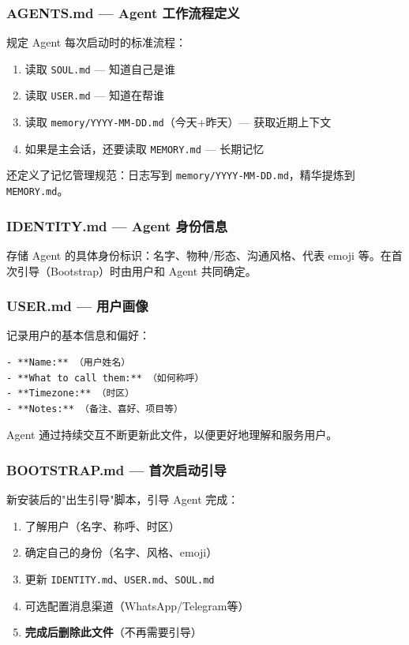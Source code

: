 \subsubsection{AGENTS.md --- Agent 工作流程定义}


规定 Agent 每次启动时的标准流程：

\begin{enumerate}
  \item 读取 \texttt{SOUL.md} --- 知道自己是谁
  \item 读取 \texttt{USER.md} --- 知道在帮谁
  \item 读取 \texttt{memory/YYYY-MM-DD.md}（今天+昨天）--- 获取近期上下文
  \item 如果是主会话，还要读取 \texttt{MEMORY.md} --- 长期记忆
\end{enumerate}

还定义了记忆管理规范：日志写到 \texttt{memory/YYYY-MM-DD.md}，精华提炼到 \texttt{MEMORY.md}。

\subsubsection{IDENTITY.md --- Agent 身份信息}


存储 Agent 的具体身份标识：名字、物种/形态、沟通风格、代表 emoji 等。在首次引导（Bootstrap）时由用户和 Agent 共同确定。

\subsubsection{USER.md --- 用户画像}


记录用户的基本信息和偏好：

\begin{lstlisting}
- **Name:** （用户姓名）
- **What to call them:** （如何称呼）
- **Timezone:** （时区）
- **Notes:** （备注、喜好、项目等）
\end{lstlisting}

Agent 通过持续交互不断更新此文件，以便更好地理解和服务用户。

\subsubsection{BOOTSTRAP.md --- 首次启动引导}


新安装后的"出生引导"脚本，引导 Agent 完成：

\begin{enumerate}
  \item 了解用户（名字、称呼、时区）
  \item 确定自己的身份（名字、风格、emoji）
  \item 更新 \texttt{IDENTITY.md}、\texttt{USER.md}、\texttt{SOUL.md}
  \item 可选配置消息渠道（WhatsApp/Telegram等）
  \item \textbf{完成后删除此文件}（不再需要引导）
\end{enumerate}

